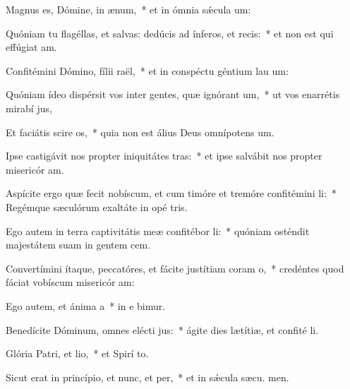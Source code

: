 \item Magnus es, Dómine, in ænum,~* et in ómnia sǽcula  um:
\item Quóniam tu flagéllas, et salvas: dedúcis ad ínferos, et recis:~* et non est qui effúgiat  am.
\item Confitémini Dómino, fílii raël,~* et in conspéctu géntium lau um:
\item Quóniam ídeo dispérsit vos inter gentes, quæ ignórant um,~* ut vos enarrétis mirabí jus,
\item Et faciátis scire os,~* quia non est álius Deus omnípotens  um.
\item Ipse castigávit nos propter iniquitátes tras:~* et ipse salvábit nos propter misericór am.
\item Aspícite ergo quæ fecit nobíscum, et cum timóre et tremóre confitémini li:~* Regémque sæculórum exaltáte in opé tris.
\item Ego autem in terra captivitátis meæ confitébor li:~* quóniam osténdit majestátem suam in gentem cem.
\item Convertímini ítaque, peccatóres, et fácite justítiam coram o,~* credéntes quod fáciat vobíscum misericór am:
\item Ego autem, et ánima a~* in e bimur.
\item Benedícite Dóminum, omnes elécti jus:~* ágite dies lætítiæ, et confité li.
\item Glória Patri, et lio,~* et Spirí to.
\item Sicut erat in princípio, et nunc, et per,~* et in sǽcula sæcu. men.
